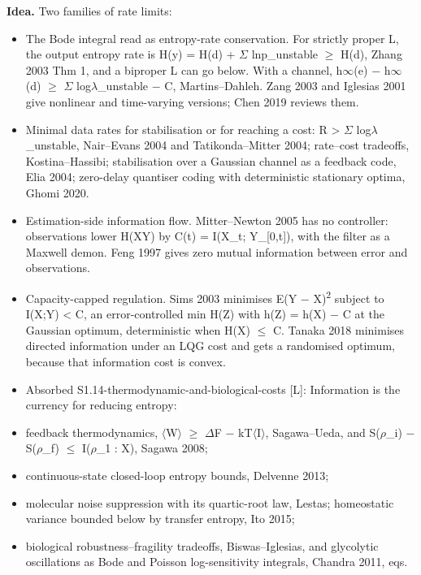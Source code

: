 \documentclass[10pt]{article}
\begin{document}
\textbf{Idea.} Two families of rate limits:
\begin{itemize}[nosep,leftmargin=1.2em]
\item The Bode integral read as entropy-rate conservation. For strictly proper L, the output entropy rate is H(y) = H(d) + \ensuremath{\Sigma} ln\textbar{}p\_unstable\textbar{} \ensuremath{\geq} H(d), Zhang 2003 Thm 1, and a biproper L can go below. With a channel, h\ensuremath{\infty}(e) \ensuremath{-} h\ensuremath{\infty}(d) \ensuremath{\geq} \ensuremath{\Sigma} log\textbar{}\ensuremath{\lambda}\_unstable\textbar{} \ensuremath{-} C, Martins--Dahleh. Zang 2003 and Iglesias 2001 give nonlinear and time-varying versions; Chen 2019 reviews them.
\item Minimal data rates for stabilisation or for reaching a cost: R \textgreater{} \ensuremath{\Sigma} log\textbar{}\ensuremath{\lambda}\_unstable\textbar{}, Nair--Evans 2004 and Tatikonda--Mitter 2004; rate--cost tradeoffs, Kostina--Hassibi; stabilisation over a Gaussian channel as a feedback code, Elia 2004; zero-delay quantiser coding with deterministic stationary optima, Ghomi 2020.
\item Estimation-side information flow. Mitter--Newton 2005 has no controller: observations lower H(X\textbar{}Y) by C(t) = I(X\_t; Y\_[0,t]), with the filter as a Maxwell demon. Feng 1997 gives zero mutual information between error and observations.
\item Capacity-capped regulation. Sims 2003 minimises E(Y \ensuremath{-} X)\textsuperscript{2} subject to I(X;Y) \textless{} C, an error-controlled min H(Z) with h(Z) = h(X) \ensuremath{-} C at the Gaussian optimum, deterministic when H(X) \ensuremath{\leq} C. Tanaka 2018 minimises directed information under an LQG cost and gets a randomised optimum, because that information cost is convex.
\item Absorbed S1.14-thermodynamic-and-biological-costs [L]: Information is the currency for reducing entropy:
\item feedback thermodynamics, \ensuremath{\langle}W\ensuremath{\rangle} \ensuremath{\geq} \ensuremath{\Delta}F \ensuremath{-} kT\ensuremath{\langle}I\ensuremath{\rangle}, Sagawa--Ueda, and S(\ensuremath{\rho}\_i) \ensuremath{-} S(\ensuremath{\rho}\_f) \ensuremath{\leq} I(\ensuremath{\rho}\_1 : X), Sagawa 2008;
\item continuous-state closed-loop entropy bounds, Delvenne 2013;
\item molecular noise suppression with its quartic-root law, Lestas; homeostatic variance bounded below by transfer entropy, Ito 2015;
\item biological robustness--fragility tradeoffs, Biswas--Iglesias, and glycolytic oscillations as Bode and Poisson log-sensitivity integrals, Chandra 2011, eqs.
\end{itemize}
\end{document}
